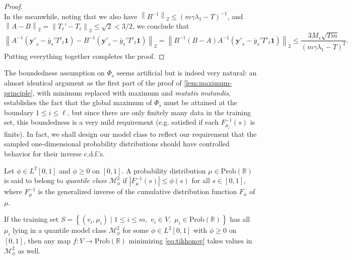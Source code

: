 \documentclass[letterpaper]{article} %
\begin{document}
\begin{proof}
\begin{equation*}
  \end{equation*}
  In the meanwhile, noting that we also have $\left\| B^{-1} \right\|_2\leq \left( m\gamma\lambda_1-T \right)^{-1}$, and $\left\| A-B \right\|_2=\left\| T_{\ell}'-T_{\ell} \right\|_2 \leq \sqrt{2}<3/2$, we conclude that
  \begin{equation*}
    \left\| A^{-1}\left(\mathbf{y'}_s-\bar{y}_s'T'_\ell\mathbf{1}\right)-B^{-1}\left(\mathbf{y'}_s-\bar{y}_s'T'_\ell\mathbf{1}\right) \right\|_2=\left\| B^{-1} \left( B-A \right) A^{-1}\left(\mathbf{y'}_s-\bar{y}_s'T'_\ell\mathbf{1}\right)\right\|_2\leq \frac{3M_s\sqrt{Tm}}{\left( m\gamma\lambda_1-T \right)^2}.
  \end{equation*}
  Putting everything together completes the proof.
\end{proof}

The boundedness assumption on $\Phi_s$ seems artificial but is indeed very natural: an almost identical argument as the first part of the proof of \eqref{lem:maximum-principle}, with minimum replaced with maximum and \emph{mutatis mutandis}, establishes the fact that the global maximum of $\Phi_s$ must be attained at the boundary $1\leq i\leq \ell$, but since there are only finitely many data in the training set, this boundedness is a very mild requirement (e.g. satisfied if each $F_{\mu_i}^{-1} \left( s \right)$ is finite). In fact, we shall design our model class to reflect our requirement that the sampled one-dimensional probability distributions should have controlled behavior for their inverse c.d.f.'s.

\begin{definition}
  Let $\phi\in L^2 \left[ 0,1 \right]$ and $\phi\geq 0$ on $\left[ 0,1 \right]$. A probability distribution $\mu\in\mathrm{Prob}\left( \mathbb{R} \right)$ is said to belong to \emph{quantile class $\mathcal{M}_{\phi}^2$} if $\left|F_{\mu}^{-1}\left( s \right)\right|\leq \phi \left( s \right)$ for all $s\in \left[0,1\right]$, where $F_{\mu}^{-1}$ is the generalized inverse of the cumulative distribution function $F_{\phi}$ of $\mu$.
\end{definition}

\begin{lemma}
  \label{lem:apriori-estimates}
  If the training set $S=\left\{ \left( v_i,\mu_i \right)\mid 1\leq i\leq m,\,\,v_i\in V,\,\,\mu_i\in\mathrm{Prob}\left( \mathbb{R} \right) \right\}$ has all $\mu_i$ lying in a quantile model class $\mathcal{M}_{\phi}^2$ for some $\phi\in L^2 \left[ 0,1 \right]$ with $\phi\geq 0$ on $\left[ 0,1 \right]$, then any map $f:V\rightarrow\mathrm{Prob}\left( \mathbb{R} \right)$ minimizing \eqref{eq:tikhonov} takes values in $\mathcal{M}_{\phi}^2$ as well.
\end{lemma}
\end{document}
